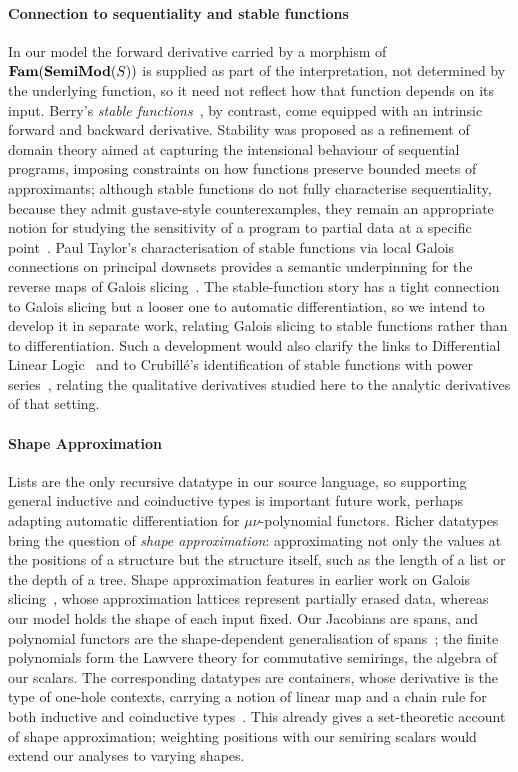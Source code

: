 \paragraph{Connection to sequentiality and stable functions}

In our model the forward derivative carried by a morphism of $\mathbf{Fam}(\mathbf{SemiMod}(S))$ is supplied as part
of the interpretation, not determined by the underlying function, so it need not reflect how that function
depends on its input. Berry's
\emph{stable functions}~\cite{berry79,berry82}, by contrast, come equipped with an intrinsic forward and
backward derivative. Stability was proposed as a refinement of domain theory aimed at capturing the
intensional behaviour of sequential programs, imposing constraints on how functions preserve bounded meets of
approximants; although stable functions do not fully characterise sequentiality, because they admit
$\mathrm{gustave}$-style counterexamples, they remain an appropriate notion for studying the sensitivity of a
program to partial data at a specific point~\cite{amadio-curien}. Paul Taylor's characterisation of stable
functions via local Galois connections on principal downsets provides a semantic underpinning for the reverse
maps of Galois slicing~\cite{taylor99}. The stable-function story has a tight connection to Galois slicing but a looser one to automatic
differentiation, so we intend to develop it in separate work, relating Galois slicing to stable functions
rather than to differentiation. Such a development would also clarify the links to Differential Linear
Logic~\cite{ehrhard_differential_2006} and to Crubill\'e's identification of stable functions with power
series~\cite{crubille18}, relating the qualitative derivatives studied here to the analytic derivatives of
that setting.

\paragraph{Shape Approximation}

Lists are the only recursive datatype in our source language, so supporting general inductive and
coinductive types is important future work, perhaps adapting  automatic differentiation
for $\mu\nu$-polynomial functors. Richer datatypes bring the question of \emph{shape approximation}:
approximating not only the values at the positions of a structure but the structure itself, such as the
length of a list or the depth of a tree. Shape approximation features in earlier work on Galois
slicing~\cite{perera12a,perera16d,ricciotti17}, whose approximation lattices represent partially erased data,
whereas our model holds the shape of each input fixed. Our Jacobians are spans, and polynomial functors are
the shape-dependent generalisation of spans~\cite{gambino-kock}; the finite polynomials form the Lawvere
theory for commutative semirings, the algebra of our scalars. The corresponding datatypes are containers,
whose derivative is the type of one-hole contexts, carrying a notion of linear map and a chain rule for both
inductive and coinductive types~\cite{abbott05}. This already gives a set-theoretic account of shape
approximation; weighting positions with our semiring scalars would extend our analyses to varying shapes.

